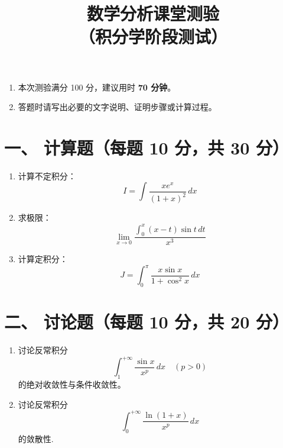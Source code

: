 \documentclass[11pt, a4paper]{article}
\title{\bfseries 数学分析课堂测验 \\ \large （积分学阶段测试）}
\date{}
\author{}
\begin{document}
\maketitle

\begin{enumerate}
    \item 本次测验满分 100 分，建议用时 {\bfseries 70 分钟}。
    \item 答题时请写出必要的文字说明、证明步骤或计算过程。
\end{enumerate}

\section*{一、 计算题（每题 10 分，共 30 分）}

\begin{enumerate}
    \item 计算不定积分：
    \[ I = \int \frac{x e^x}{(1+x)^2} \, dx \]
    
    \vspace{2em} %
    
    \item 求极限：
    \[ \lim_{x \to 0} \frac{\int_0^x (x-t)\sin t \, dt}{x^3} \]
    
    \vspace{2em}
    
    \item 计算定积分：
    \[ J = \int_0^\pi \frac{x \sin x}{1+\cos^2 x} \, dx \]
\end{enumerate}

\vspace{2em}

\section*{二、 讨论题（每题 10 分，共 20 分）}

\begin{enumerate}
    \item[4.] 讨论反常积分 
    \[ \int_1^{+\infty} \frac{\sin x}{x^p} \, dx \quad (p > 0) \]
    的绝对收敛性与条件收敛性。

    \vspace{2em}
    \item[5.] 讨论反常积分 $$\displaystyle \int_{0}^{+\infty} \frac{\ln(1+x)}{x^p} \, dx  $$ 的敛散性.
\end{enumerate}

\vspace{2em}
\end{document}
